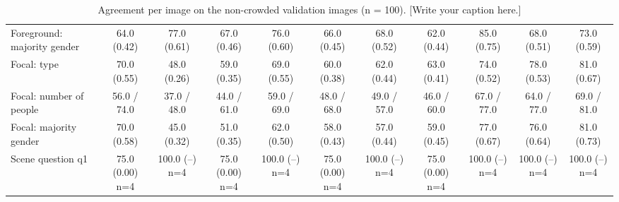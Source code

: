 \begin{table}[t]
{\begin{tabular}{@{}lcccccccccc@{}}
Foreground: majority gender & 64.0 (0.42) & 77.0 (0.61) & 67.0 (0.46) & 76.0 (0.60) & 66.0 (0.45) & 68.0 (0.52) & 62.0 (0.44) & 85.0 (0.75) & 68.0 (0.51) & 73.0 (0.59) \\
Focal: type & 70.0 (0.55) & 48.0 (0.26) & 59.0 (0.35) & 69.0 (0.55) & 60.0 (0.38) & 62.0 (0.44) & 63.0 (0.41) & 74.0 (0.52) & 78.0 (0.53) & 81.0 (0.67) \\
Focal: number of people & 56.0 / 74.0 & 37.0 / 48.0 & 44.0 / 61.0 & 59.0 / 69.0 & 48.0 / 68.0 & 49.0 / 57.0 & 46.0 / 60.0 & 67.0 / 77.0 & 64.0 / 77.0 & 69.0 / 81.0 \\
Focal: majority gender & 70.0 (0.58) & 45.0 (0.32) & 51.0 (0.35) & 62.0 (0.50) & 58.0 (0.43) & 57.0 (0.44) & 59.0 (0.45) & 77.0 (0.67) & 76.0 (0.64) & 81.0 (0.73) \\
Scene question q1 & 75.0 (0.00) n=4 & 100.0 (--) n=4 & 75.0 (0.00) n=4 & 100.0 (--) n=4 & 75.0 (0.00) n=4 & 100.0 (--) n=4 & 75.0 (0.00) n=4 & 100.0 (--) n=4 & 100.0 (--) n=4 & 100.0 (--) n=4 \\
\bottomrule
\end{tabular}}
\caption{Agreement per image on the non-crowded validation images (n = 100). [Write your caption here.]}
\label{tab:human-validation}
\end{table}
